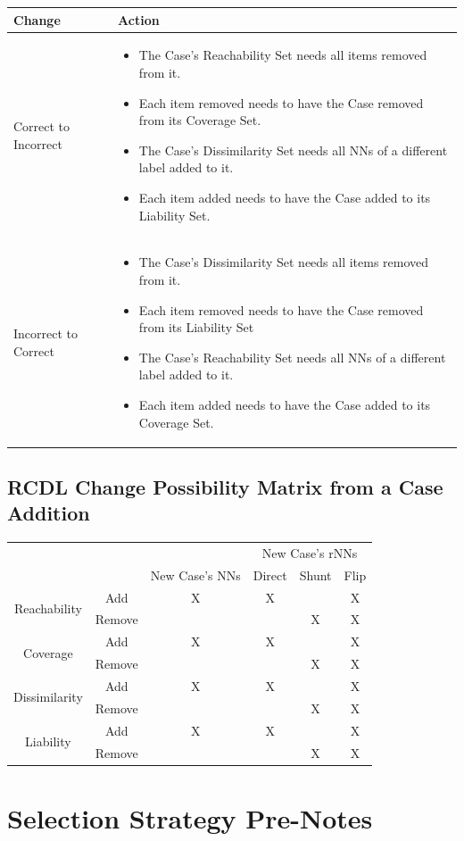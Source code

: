 \documentclass[a4paper,11pt]{report}
\begin{document}
\begin{tabular}{|x{60pt}|x{300pt}|}
\hline 
Change & Action \tabularnewline 
\hline 
Correct to Incorrect & 
\begin{itemize}
	\item The Case's Reachability Set needs all items removed from it.
	\item Each item removed needs to have the Case removed from its Coverage Set.
	\item The Case's Dissimilarity Set needs all NNs of a different label added to it.
	\item Each item added needs to have the Case added to its Liability Set.
\end{itemize} \tabularnewline 
\hline 
Incorrect to Correct & 
\begin{itemize}
	\item The Case's Dissimilarity Set needs all items removed from it.
	\item Each item removed needs to have the Case removed from its Liability Set
	\item The Case's Reachability Set needs all NNs of a different label added to it.
	\item Each item added needs to have the Case added to its Coverage Set.
\end{itemize} \tabularnewline 
\hline 
\end{tabular}	

\subsection{RCDL Change Possibility Matrix from a Case Addition}
\begin{tabular}{|c|c|c|c|c|c|}
\cline{4-6} 
\multicolumn{1}{c}{} & \multicolumn{1}{c}{} &  & \multicolumn{3}{c|}{New Case's rNNs}\tabularnewline
\cline{3-6} 
\multicolumn{1}{c}{} &  & New Case's NNs & Direct & Shunt & Flip\tabularnewline
\hline 
\multirow{2}{*}{Reachability} & Add & X & X &  & X\tabularnewline
\cline{2-6} 
 & Remove &  &  & X & X\tabularnewline
\hline 
\multirow{2}{*}{Coverage} & Add & X & X &  & X\tabularnewline
\cline{2-6} 
 & Remove &  &  & X & X\tabularnewline
\hline 
\multirow{2}{*}{Dissimilarity} & Add & X & X &  & X\tabularnewline
\cline{2-6} 
 & Remove &  &  & X & X\tabularnewline
\hline 
\multirow{2}{*}{Liability} & Add & X & X &  & X\tabularnewline
\cline{2-6} 
 & Remove &  &  & X & X\tabularnewline
\hline 
\end{tabular}
	
\section{Selection Strategy Pre-Notes}
\end{document}

